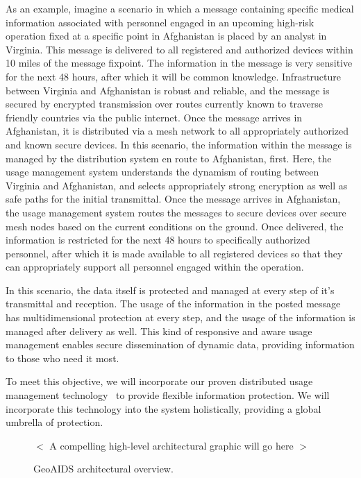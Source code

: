 \documentclass{sbir}
\begin{document}
As an example, imagine a scenario in which a message containing specific medical information associated with personnel engaged in an upcoming high-risk operation fixed at a specific point in Afghanistan is placed by an analyst in Virginia. This message is delivered to all registered and authorized devices within 10 miles of the message fixpoint. The information in the message is very sensitive for the next 48 hours, after which it will be common knowledge. Infrastructure between Virginia and Afghanistan is robust and reliable, and the message is secured by encrypted transmission over routes currently known to traverse friendly countries via the public internet. Once the message arrives in Afghanistan, it is distributed via a mesh network to all appropriately authorized and known secure devices. In this scenario, the information within the message is managed by the distribution system en route to Afghanistan, first. Here, the usage management system understands the dynamism of routing between Virginia and Afghanistan, and selects appropriately strong encryption as well as safe paths for the initial transmittal. Once the message arrives in Afghanistan, the usage management system routes the messages to secure devices over secure mesh nodes based on the current conditions on the ground. Once delivered, the information is restricted for the next 48 hours to specifically authorized personnel, after which it is made available to all registered devices so that they can appropriately support all personnel engaged within the operation.

In this scenario, the data itself is protected and managed at every step of it's transmittal and reception. The usage of the information in the posted message has multidimensional protection at every step, and the usage of the information is managed after delivery as well. This kind of responsive and aware usage management enables secure dissemination of dynamic data, providing information to those who need it most.

To meet this objective, we will incorporate our proven distributed usage management technology~\cite{HeHeShGiJa:11,JaHeLa:10,JaLaHe:11} to provide flexible information protection. We will incorporate this technology into the system holistically, providing a global umbrella of protection.

\begin{figure}
 \vspace{1in}
 \begin{center}
  $<$ A compelling high-level architectural graphic will go here $>$
  \end{center}
 \vspace{1in}
  \caption{GeoAIDS architectural overview.}\label{GeoAIDarch}
 \end{figure}
\end{document}
